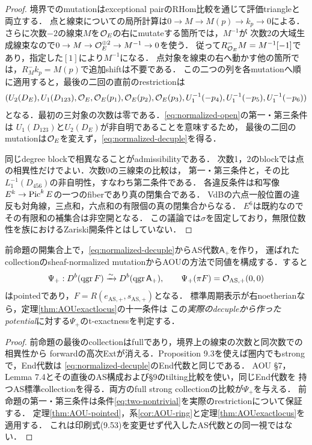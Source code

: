 \begin{proof}
境界でのmutationはexceptional pairのRHom比較を通じて評価triangleと両立する．
点と線束についての局所計算は$0\to M\to M(p)\to k_p\to0$による．
さらに次数$-2$の線束$M$を$\mathcal O_E$の右にmutateする箇所では，$M^{-1}$が
次数2の大域生成線束なので$0\to M\to\mathcal O_E^{\oplus2}\to M^{-1}\to0$を使う．
従って$R^-_{\mathcal O_E}M=M^{-1}[-1]$であり，指定した$[1]$により$M^{-1}$になる．
点対象を線束の右へ動かす他の箇所では，$R^-_M k_p=M(p)$で追加shiftは不要である．
この二つの列を各mutationへ順に適用すると，最後の二回の直前のrestrictionは
\[
 (U_2(D_E),U_1(D_{123}),\mathcal O_E,\mathcal O_E(p_1),\mathcal O_E(p_2),\mathcal O_E(p_3),
 U_1^{-1}(-p_4),U_1^{-1}(-p_5),U_1^{-1}(-p_6))
\]
となる．最初の三対象の次数は零である．\eqref{eq:normalized-open}の第一・第三条件は
$U_1(D_{123})$と$U_2(D_E)$が非自明であることを意味するため，
最後の二回のmutationは$\mathcal O_E$を変えず，\eqref{eq:normalized-decuple}を得る．

同じdegree blockで相異なることがadmissibilityである\cite[Definition 7.1]{AOU}．
次数1，2のblockでは点の相異性だけでよい．次数0の三線束の比較は，
第一・第三条件と，その比$L_1^{-1}(D_{456})$の非自明性，すなわち第二条件である．
各違反条件は和写像$E^k\to\operatorname{Pic}^k E$の一つのfiberであり真の閉集合である．
VdBの六点一般位置の違反も対角線，三点和，六点和の有限個の真の閉集合からなる．
$E^6$は既約なのでその有限和の補集合は非空開となる．
この議論では$\sigma$を固定しており，無限位数性を族におけるZariski開条件とはしていない．
\end{proof}

\begin{corollary}[規格化したAOU型同値への適用]\label{cor:normalized-pointed}
前命題の開集合上で，\eqref{eq:normalized-decuple}からAS代数$\mathsf A_+$を作り，
運ばれたcollectionのsheaf-normalized mutationからAOUの方法で同値を構成する．すると
\[
 \Psi_+:D^b(\operatorname{qgr} F)\xrightarrow{\sim}D^b(\operatorname{qgr}\mathsf A_+),\qquad
 \Psi_+(\pi F)=\mathcal O_{\mathrm{AS},+}(0,0)
\]
はpointedであり，$F=R(e_{\mathrm{AS},+},s_{\mathrm{AS},+})$となる．
標準周期表示が右noetherianなら，定理\ref{thm:AOUexactlocus}の十一条件は
この\emph{実際のdecupleから作ったpotential}に対する$\Psi_+$のt-exactnessを判定する．
\end{corollary}
\begin{proof}
前命題の最後のcollectionはfullであり，境界上の線束の次数と同次数での相異性から
forwardの高次Extが消える．Proposition 9.3を使えば圏内でもstrongで，End代数は
\eqref{eq:normalized-decuple}のEnd代数と同じである．
AOU \S7，Lemma 7.4とその直後のAS構成および\S9のtilting比較を使い，同じEnd代数を
持つAS標準collectionを得る．両方のfull strong collectionの比較が$\Psi_+$を与える．
前命題の第一・第三条件は条件\eqref{eq:two-nontrivial}を実際のrestrictionについて保証する．
定理\ref{thm:AOU-pointed}，系\ref{cor:AOU-ring}と定理\ref{thm:AOUexactlocus}を適用する．
これは印刷式(9.53)を変更せず代入したAS代数との同一視ではない．
\end{proof}


